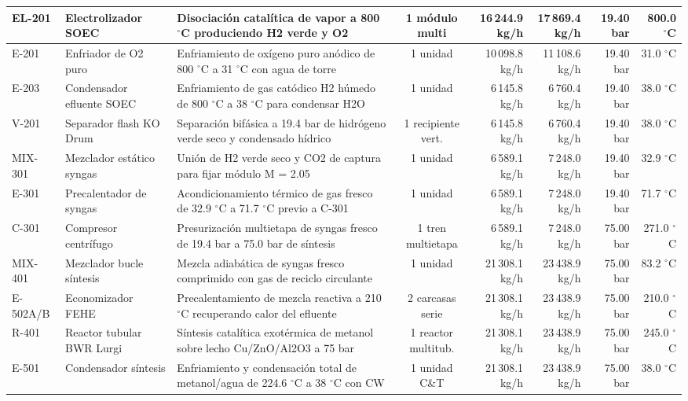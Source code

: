 \documentclass[10pt,letterpaper]{article}
\begin{document}
\begin{landscape}
\begin{xltabular}{\linewidth}{|l|p{2.6cm}|p{5.5cm}|c|r|r|r|r|}
EL-201 & Electrolizador SOEC & Disociación catalítica de vapor a 800 $^\circ$C produciendo H2 verde y O2 & 1 módulo multi & 16\,244.9 kg/h & 17\,869.4 kg/h & 19.40 bar & 800.0 $^\circ$C \\ \hline
E-201 & Enfriador de O2 puro & Enfriamiento de oxígeno puro anódico de 800 $^\circ$C a 31 $^\circ$C con agua de torre & 1 unidad & 10\,098.8 kg/h & 11\,108.6 kg/h & 19.40 bar & 31.0 $^\circ$C \\ \hline
E-203 & Condensador efluente SOEC & Enfriamiento de gas catódico H2 húmedo de 800 $^\circ$C a 38 $^\circ$C para condensar H2O & 1 unidad & 6\,145.8 kg/h & 6\,760.4 kg/h & 19.40 bar & 38.0 $^\circ$C \\ \hline
V-201 & Separador flash KO Drum & Separación bifásica a 19.4 bar de hidrógeno verde seco y condensado hídrico & 1 recipiente vert. & 6\,145.8 kg/h & 6\,760.4 kg/h & 19.40 bar & 38.0 $^\circ$C \\ \hline
MIX-301 & Mezclador estático syngas & Unión de H2 verde seco y CO2 de captura para fijar módulo M = 2.05 & 1 unidad & 6\,589.1 kg/h & 7\,248.0 kg/h & 19.40 bar & 32.9 $^\circ$C \\ \hline
E-301 & Precalentador de syngas & Acondicionamiento térmico de gas fresco de 32.9 $^\circ$C a 71.7 $^\circ$C previo a C-301 & 1 unidad & 6\,589.1 kg/h & 7\,248.0 kg/h & 19.40 bar & 71.7 $^\circ$C \\ \hline
C-301 & Compresor centrífugo & Presurización multietapa de syngas fresco de 19.4 bar a 75.0 bar de síntesis & 1 tren multietapa & 6\,589.1 kg/h & 7\,248.0 kg/h & 75.00 bar & 271.0 $^\circ$C \\ \hline
MIX-401 & Mezclador bucle síntesis & Mezcla adiabática de syngas fresco comprimido con gas de reciclo circulante & 1 unidad & 21\,308.1 kg/h & 23\,438.9 kg/h & 75.00 bar & 83.2 $^\circ$C \\ \hline
E-502A/B & Economizador FEHE & Precalentamiento de mezcla reactiva a 210 $^\circ$C recuperando calor del efluente & 2 carcasas serie & 21\,308.1 kg/h & 23\,438.9 kg/h & 75.00 bar & 210.0 $^\circ$C \\ \hline
R-401 & Reactor tubular BWR Lurgi & Síntesis catalítica exotérmica de metanol sobre lecho Cu/ZnO/Al2O3 a 75 bar & 1 reactor multitub. & 21\,308.1 kg/h & 23\,438.9 kg/h & 75.00 bar & 245.0 $^\circ$C \\ \hline
E-501 & Condensador síntesis & Enfriamiento y condensación total de metanol/agua de 224.6 $^\circ$C a 38 $^\circ$C con CW & 1 unidad C\&T & 21\,308.1 kg/h & 23\,438.9 kg/h & 75.00 bar & 38.0 $^\circ$C \\ \hline

\end{xltabular}
\end{landscape}
\end{document}
